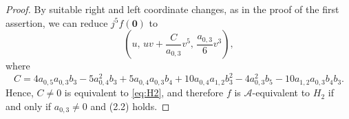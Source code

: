 \documentclass[12pt]{amsart}
\theoremstyle{plain}
\theoremstyle{definition}
\newcommand{\R}{\mathbb{R}}
\begin{document}
\begin{proof}
By suitable right and left coordinate changes, as in the proof of the first assertion, we can reduce $j^5f(\bm{0})$ to
$$
\left(u,\, uv+\frac{C}{a_{0,3}}v^5,\, \frac{a_{0,3}}6v^3 \right),
$$
where
$$
C= 4a_{0,5}a_{0,3}b_3-5a_{0,4}^2b_3+5a_{0,4}a_{0,3}b_4+10a_{0,4}a_{1,2}b_3^2-4a_{0,3}^2b_5-10a_{1,2}a_{0,3}b_4b_3.
$$
Hence, $C\ne0$ is equivalent to \eqref{eq:H2}, and therefore $f$ is $\mathcal{A}$-equivalent to $H_2$ if and only if $a_{0,3}\ne0$ and (2.2) holds.

\end{proof}
\end{document}
